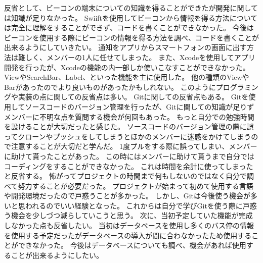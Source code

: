 \documentclass[openany,11pt,papersize]{jsbook}
\begin{document}
反省として、ビーコンの端末についての知識を得ることができたが開発に関しては知識が足りなかった。
Swiiftを使用してビーコンから情報を得る方法については完全に理解をすることができず、コードを書くことができなかった。
今後はビーコンを使用する際にビーコンの情報を得る方法を調べ、コードを書くことが出来るようにしていきたい。
通知をアプリからスマートフォンの画面に出す方法は難しく、メンバーの1人に任せてしまった。
また、Xcodeを使用してアプリ開発を行ったが、Xcodeの機能の内一部しか使いこなすことができなかった。
ViewやSearchBar、Label、といった機能を主に使用した。
他の種類のViewやBarがあったのでより良いものがあったかもしれない。
このようにプログラミングや実装の点に関しての反省点は多い。
Gitに関しての反省点もある。
Gitを使用してソースコードのバージョン管理を行ったが、Gitに関しての知識が足りずメンバーに不明な点を質問する機会が何回もあった。
もっと自分での勉強時間を設けることが大切だったと感じた。
ソースコードのバージョン管理の際に誤ってクローンやプッシュをしてしまうとほかのメンバーに迷惑をかけてしまうので注意することが大切だと学んだ。
1度プルをする際に誤ってしまい、メンバーに助けて貰ったことがあった。
この時にはメンバーに助けて貰うまで自分ではコーディングをすることができなかった。
これは時間を余計に使ってしまったと反省する。
怖がってプロジェクトの時間まで何もしないのではなく自分で調べて努力することが必要だった。
プロジェクトが始まって初めて使用する言語や開発環境だったので戸惑うことが多かった。
しかし、Gitは今後使う機会が多いと思われるのでいい経験となった。
これからは自分で学びGitを使う際に戸惑う機会を少しづつ減らしていこうと思う。
次に、当初予定していた機能が完成しなかった点も反省したい。
当初はデータベースを使用し多くのバス停の情報を使用する予定だったがデータベースの導入が間に合わなかったため使用することができなかった。
今後はデータベースについても調べ、機会があれば使用することが出来るようにしたい。

\end{document}
